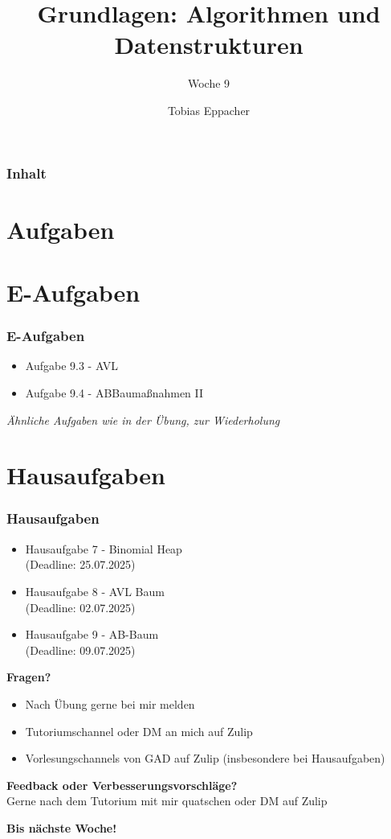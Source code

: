 \documentclass{beamer}
\title{Grundlagen: Algorithmen und Datenstrukturen}
\author{Tobias Eppacher}
\date{\presdatum}
\institute{School of Computation, Information and Technology}
\subtitle{Woche 9}
\begin{document}
\begin{frame}
	\titlepage
\end{frame}

\begin{frame}
	\frametitle{Inhalt}
	\tableofcontents[subsectionstyle=hide]
\end{frame}

\section{Aufgaben}





\section{E-Aufgaben}
\begin{frame}
	\frametitle{E-Aufgaben}
	\begin{itemize}
		\item Aufgabe 9.3 - AVL
		\item Aufgabe 9.4 - ABBaumaßnahmen II
	\end{itemize}
	\medskip
	\textit{Ähnliche Aufgaben wie in der Übung, zur Wiederholung}
\end{frame}

\section{Hausaufgaben}
\begin{frame}
	\frametitle{Hausaufgaben}
	\begin{itemize}
		\item Hausaufgabe 7 - Binomial Heap \\
		      (Deadline: 25.07.2025)
		\item Hausaufgabe 8 - AVL Baum \\
		      (Deadline: 02.07.2025)
		\item Hausaufgabe 9 - AB-Baum \\
		      (Deadline: 09.07.2025)
	\end{itemize}
\end{frame}

\begin{frame}
	\textbf{Fragen?}
	\begin{itemize}
		\item Nach Übung gerne bei mir melden
		\item Tutoriumschannel oder DM an mich auf Zulip
		\item Vorlesungschannels von GAD auf Zulip (insbesondere bei Hausaufgaben)
	\end{itemize}

	\medskip
	\textbf{Feedback oder Verbesserungsvorschläge?} \\
	Gerne nach dem Tutorium mit mir quatschen oder DM auf Zulip

	\medskip
	\textbf{Bis nächste Woche!}
\end{frame}

\end{document}
